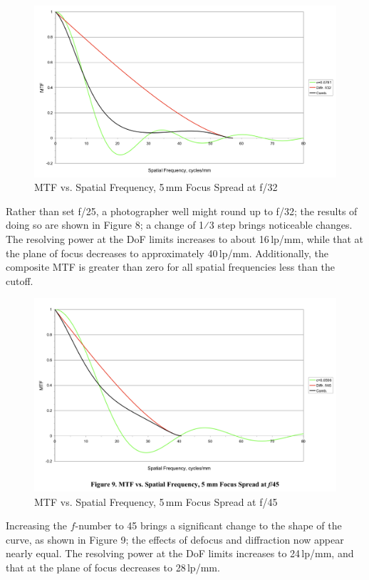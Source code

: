 \documentclass[11pt, oneside]{scrartcl}   	%
\begin{document}
\begin{figure}[htbp] %
   \centering
   \includegraphics[width=\linewidth]{figure/fig_dofd_8} 
   \caption{MTF vs. Spatial Frequency, 5\,mm Focus Spread at f/32}
   \label{fig:MTFvssf32}
\end{figure}
Rather than set f/25, a photographer well might round up to f/32; the results of doing so are shown in Figure 8; a change of 1⁄3 step brings noticeable changes. The resolving power at the DoF limits increases to about 16\,lp/mm, while that at the plane of focus decreases to approximately 40\,lp/mm. Additionally, the composite MTF is greater than zero for all spatial frequencies less than the cutoff.

\begin{figure}[htbp] %
   \centering
   \includegraphics[width=\linewidth]{figure/fig_dofd_9} 
   \caption{MTF vs. Spatial Frequency, 5\,mm Focus Spread at f/45}
   \label{fig:MTFvssf45}
\end{figure}
Increasing the $f$-number to 45 brings a significant change to the shape of the curve, as shown in Figure 9; the effects of defocus and diffraction now appear nearly equal. The resolving power at the DoF limits increases to 24\,lp/mm, and that at the plane of focus decreases to 28\,lp/mm.
\end{document}
